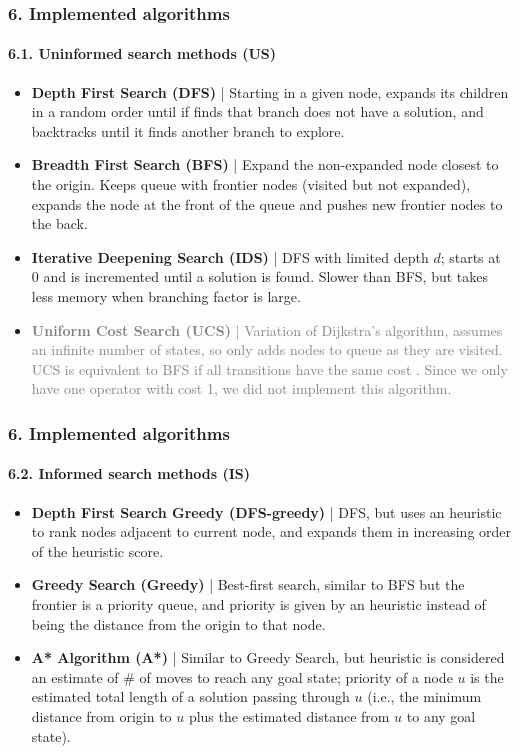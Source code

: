 \documentclass{beamer}
\begin{document}
\begin{frame}
\frametitle{6. Implemented algorithms}
\framesubtitle{6.1. Uninformed search methods (US)}

\begin{itemize}
  \item \textbf{Depth First Search (DFS)} | Starting in a given node, expands its children in a random order until if finds that branch does not have a solution, and backtracks until it finds another branch to explore. 
  
  \item \textbf{Breadth First Search (BFS)} |  Expand the non-expanded node closest to the origin. Keeps queue with frontier nodes (visited but not expanded), expands the node at the front of the queue and pushes new frontier nodes to the back.
  
  \item \textbf{Iterative Deepening Search (IDS)} | DFS with limited depth $d$; starts at $0$ and is incremented until a solution is found. Slower than BFS, but takes less memory when branching factor is large.
  
  \item \textcolor{gray}{\textbf{Uniform Cost Search (UCS)} | Variation of Dijkstra's algorithm, assumes an infinite number of states, so only adds nodes to queue as they are visited.
  UCS is equivalent to BFS if all transitions have the same cost \cite{javatpoint-uninformed}.
  Since we only have one operator with cost 1, we did not implement this algorithm.}
\end{itemize}
\end{frame}

\begin{frame}
\frametitle{6. Implemented algorithms}
\framesubtitle{6.2. Informed search methods (IS)}

\begin{itemize}  
  \item \textbf{Depth First Search Greedy (DFS-greedy)} | DFS, but uses an heuristic to rank nodes adjacent to current node, and expands them in increasing order of the heuristic score.
  \item \textbf{Greedy Search (Greedy)} | Best-first search, similar to BFS but the frontier is a priority queue, and priority is given by an heuristic instead of being the distance from the origin to that node.
  \item \textbf{A* Algorithm (A*)} | Similar to Greedy Search, but heuristic is considered an estimate of \# of moves to reach any goal state; priority of a node $u$ is the estimated total length of a solution passing through $u$ (i.e., the minimum distance from origin to $u$ plus the estimated distance from $u$ to any goal state).
\end{itemize}
\end{frame}
\end{document}
